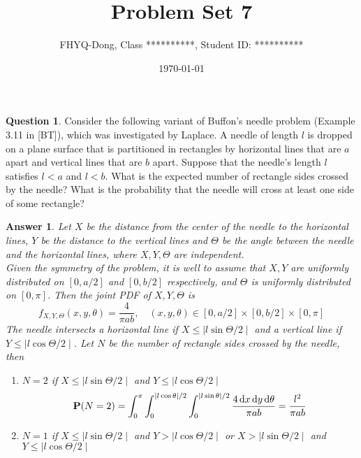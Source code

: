 \documentclass[utf8]{article}
\title{Problem Set 7}
\author{ FHYQ-Dong, Class **********, Student ID: ********** }
\date{\today}
\theoremstyle{definition}%
\newtheorem{question}{Question} %
\theoremstyle{plain}%
\newtheorem{answer}{Answer} %
\begin{document}
\maketitle
\thispagestyle{fancy}

\begin{question}
    Consider the following variant of Buffon's needle problem (Example 3.11 in [BT]), which was investigated by Laplace. A needle of length $l$ is dropped on a plane surface that is partitioned in rectangles by horizontal lines that are $a$ apart and vertical lines that are $b$ apart. Suppose that the needle's length $l$ satisfies $l < a$ and $l < b$. What is the expected number of rectangle sides crossed by the needle? What is the probability that the needle will cross at least one side of some rectangle?
\end{question}
\begin{answer}
    Let $X$ be the distance from the center of the needle to the horizontal lines, $Y$ be the distance to the vertical lines and $\Theta$ be the angle between the needle and the horizontal lines, where $X, Y, \Theta$ are independent. \\ 
    Given the symmetry of the problem, it is well to assume that $X, Y$ are uniformly distributed on $[0, a/2]$ and $[0, b/2]$ respectively, and $\Theta$ is uniformly distributed on $[0, \pi]$. Then the joint PDF of $X, Y, \Theta$ is
    \begin{equation}
        f_{X, Y, \Theta}(x, y, \theta) = \frac{4}{\pi a b}, \quad (x, y, \theta) \in [0, a/2] \times [0, b/2] \times [0, \pi]
    \end{equation}
    The needle intersects a horizontal line if $X \leq \mid l \sin \Theta / 2 \mid$ and a vertical line if $Y \leq \mid l \cos \Theta / 2 \mid$. Let $N$ be the number of rectangle sides crossed by the needle, then
    \begin{enumerate}[label=(\alph*)]
        \item $N = 2$ if $X \leq \mid l \sin \Theta / 2 \mid$ and $Y \leq \mid l \cos \Theta / 2 \mid$
        \begin{equation}
            \mathbf{P}(N = 2) = \int_{0}^{\pi}\int_{0}^{\abs{l\cos\theta}/2}\int_{0}^{\abs{l\sin\theta}/2} \frac{4 \dd{x}\dd{y}\dd{\theta}}{\pi a b} = \frac{l^2}{\pi ab}
        \end{equation}
        \item $N = 1$ if $X \leq \mid l \sin \Theta / 2 \mid$ and $Y > \mid l \cos \Theta / 2 \mid$ or $X > \mid l \sin \Theta / 2 \mid$ and $Y \leq \mid l \cos \Theta / 2 \mid$

\end{enumerate}
\end{answer}
\end{document}
